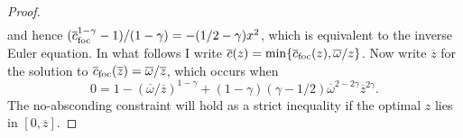 \documentclass[11pt]{article}
\theoremstyle{plain}
\theoremstyle{definition} %
\begin{document}
\begin{proof}
\begin{align*}
\end{align*}
and hence $(\overline{c}_{\textnormal{foc}}^{1-\gamma} - 1)/(1 - \gamma) = - (1/2 - \gamma) x^2$, which is equivalent to the inverse Euler equation. In what follows I write $\overline{c}(z) = \min\{\overline{c}_{\textnormal{foc}}(z), \overline{\omega}/z\}$. Now write $\overline{z}$ for the solution to $\overline{c}_{\textnormal{foc}}(\overline{z}) = \overline{\omega}/\overline{z}$, which occurs when 
$$
0=1-(\overline{\omega}/\overline{z})^{1-\gamma}+(1-\gamma)(\gamma-1/2)\overline{\omega}^{2-2\gamma}\overline{z}^{2\gamma}. 
$$
The no-absconding constraint will hold as a strict inequality if the optimal $z$ lies in $[0, \overline{z}]$. 
\end{proof}

\iffalse
It remains to show that this holds for sufficiently small $S$. The optimal $z$ then solves
\begin{align*}
\sup_{z \in [0, \overline{z}]} \frac{(Sz - 1)\overline{c}(z)}{1 + (\overline{c}(z)^{1-\gamma}-1)/(1-\gamma) - \gamma z^2\overline{c}(z)^{2-2\gamma}/2}.
\end{align*}
It will suffice to show that for sufficiently small $S$, $z=0$ gives a higher payoff than anything above $\overline{z}$. Can we make this uniform? For $z \geq \overline{z}$, we have 
\begin{align*}
\frac{S\overline{\omega} - \overline{\omega}/z}{1 + ((\overline{\omega}/z)^{1-\gamma}-1)/(1-\gamma) - \gamma z^{2\gamma}\overline{\omega}^{2-2\gamma}/2}
\end{align*}
\fi


\iffalse
\end{document}
